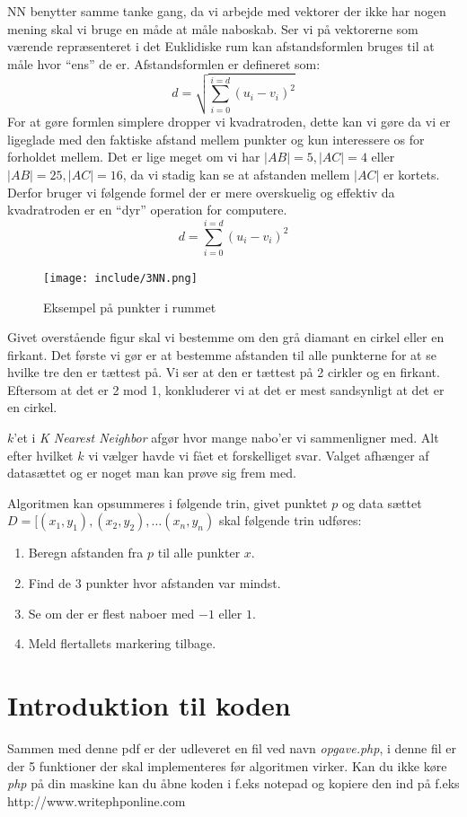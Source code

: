 \documentclass[14pt]{article}
\begin{document}
NN benytter samme tanke gang, da vi arbejde med vektorer der ikke har nogen
mening skal vi bruge en måde at måle naboskab. Ser vi på vektorerne som værende
repræsenteret i det Euklidiske rum kan afstandsformlen bruges til at måle hvor
``ens'' de er.
Afstandsformlen er defineret som:
$$
    d = \sqrt{\sum_{i=0}^{i=d} (u_i - v_i)^2}
$$
For at gøre formlen simplere dropper vi kvadratroden, dette kan vi gøre da vi
er ligeglade med den faktiske afstand mellem punkter og kun interessere os for
forholdet mellem. Det er lige meget om vi har $|AB| = 5, |AC| = 4$ eller
$|AB| = 25, |AC| = 16$, da vi stadig kan se at afstanden mellem $|AC|$ er
kortets. Derfor bruger vi følgende formel der er mere overskuelig og effektiv
da kvadratroden er en ``dyr'' operation for computere.
$$
    d = \sum_{i=0}^{i=d} (u_i - v_i)^2
$$


\newpage
    \begin{figure}[ht]
        \centering\texttt{[image: include/3NN.png]}
        \caption{Eksempel på punkter i rummet}
    \end{figure}
    Givet overstående figur skal vi bestemme om den grå diamant en cirkel
    eller en firkant. Det første vi gør er at bestemme afstanden til alle
    punkterne for at se hvilke tre den er tættest på. Vi ser at den er tættest
    på 2 cirkler og en firkant. Eftersom at det er 2 mod 1, konkluderer vi at
    det er mest sandsynligt at det er en cirkel.

    $k$'et i \emph{K Nearest Neighbor} afgør hvor mange nabo'er vi sammenligner
    med. Alt efter hvilket $k$ vi vælger havde vi fået et forskelliget svar.
    Valget afhænger af datasættet og er noget man kan prøve sig frem med.

    Algoritmen kan opsummeres i følgende trin, givet punktet $p$ og data sættet
    $D = [(x_1,y_1),(x_2,y_2),\dots (x_n,y_n)$ skal følgende trin udføres:
    \begin{enumerate}
        \item Beregn afstanden fra $p$ til alle punkter $x$.
        \item Find de $3$ punkter hvor afstanden var mindst.
        \item Se om der er flest naboer med $-1$ eller $1$.
        \item Meld flertallets markering tilbage.
    \end{enumerate}




\section*{Introduktion til koden}
Sammen med denne pdf er der udleveret en fil ved navn \emph{opgave.php},
i denne fil er der 5 funktioner der skal implementeres før algoritmen virker.
Kan du ikke køre \emph{php} på din maskine kan du åbne koden i f.eks notepad
og kopiere den ind på f.eks http://www.writephponline.com
\end{document}
